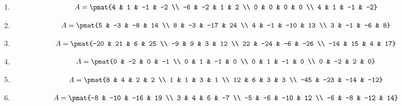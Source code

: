 \begin{enumerate}
\item

\begin{align*}
A = \pmat{4 & 1 & -1 & -2 \\ -6 & -2 & 1 & 2 \\ 0 & 0 & 0 & 0 \\ 4 & 1 & -1 & -2}
\end{align*}

\item

\begin{align*}
A = \pmat{5 & -3 & -8 & 14 \\ 8 & -3 & -17 & 24 \\ 4 & -1 & -10 & 13 \\ 3 & -1 & -6 & 8}
\end{align*}

\item

\begin{align*}
A = \pmat{-20 & 21 & 6 & 25 \\ -9 & 9 & 3 & 12 \\ 22 & -24 & -6 & -26 \\ -14 & 15 & 4 & 17}
\end{align*}

\item

\begin{align*}
A = \pmat{0 & -2 & 0 & -1 \\ 0 & 1 & -1 & 0 \\ 0 & 1 & -1 & 0 \\ 0 & -2 & 2 & 0}
\end{align*}

\item

\begin{align*}
A = \pmat{8 & 4 & 2 & 2 \\ 1 & 1 & 3 & 1 \\ 12 & 6 & 3 & 3 \\ -45 & -23 & -14 & -12}
\end{align*}

\item

\begin{align*}
A = \pmat{-8 & -10 & -16 & 19 \\ 3 & 4 & 6 & -7 \\ -5 & -6 & -10 & 12 \\ -6 & -8 & -12 & 14}
\end{align*}


\end{enumerate}
